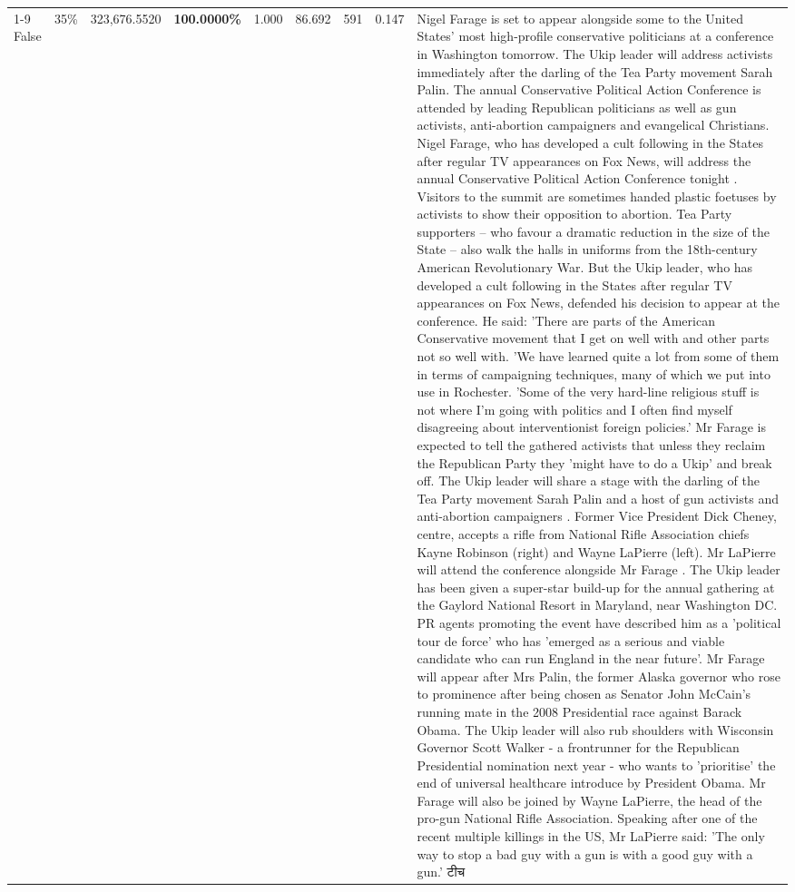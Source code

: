 \begin{table}[H]
\begin{tabular}{lllrlllll}
\cline{1-9} \cline{2-9}
False & 35\% & 323,676.5520 & \bfseries \color{red} 100.0000\% & 1.000 & 86.692 & 591 & 0.147 & Nigel Farage is set to appear alongside some to the United States' most high-profile conservative politicians at a conference in Washington tomorrow. The Ukip leader will address activists immediately after the darling of the Tea Party movement Sarah Palin. The annual Conservative Political Action Conference is attended by leading Republican politicians as well as gun activists, anti-abortion campaigners and evangelical Christians. Nigel Farage, who has developed a cult following in the States after regular TV appearances on Fox News, will address the annual Conservative Political Action Conference tonight . Visitors to the summit are sometimes handed plastic foetuses by activists to show their opposition to abortion. Tea Party supporters – who favour a dramatic reduction in the size of the State – also walk the halls in uniforms from the 18th-century American Revolutionary War. But the Ukip leader, who has developed a cult following in the States after regular TV appearances on Fox News, defended his decision to appear at the conference. He said: 'There are parts of the American Conservative movement that I get on well with and other parts not so well with. 'We have learned quite a lot from some of them in terms of campaigning techniques, many of which we put into use in Rochester. 'Some of the very hard-line religious stuff is not where I'm going with politics and I often find myself disagreeing about interventionist foreign policies.' Mr Farage is expected to tell the gathered activists that unless they reclaim the Republican Party they 'might have to do a Ukip' and break off. The Ukip leader will share a stage with the darling of the Tea Party movement Sarah Palin and a host of gun activists and anti-abortion campaigners . Former Vice President Dick Cheney, centre, accepts a rifle from National Rifle Association chiefs Kayne Robinson (right) and Wayne LaPierre (left). Mr LaPierre will attend the conference alongside Mr Farage . The Ukip leader has been given a super-star build-up for the annual gathering at the Gaylord National Resort in Maryland, near Washington DC. PR agents promoting the event have described him as a 'political tour de force' who has 'emerged as a serious and viable candidate who can run England in the near future'. Mr Farage will appear after Mrs Palin, the former Alaska governor who rose to prominence after being chosen as Senator John McCain's running mate in the 2008 Presidential race against Barack Obama. The Ukip leader will also rub shoulders with Wisconsin Governor Scott Walker - a frontrunner for the Republican Presidential nomination next year - who wants to 'prioritise' the end of universal healthcare introduce by President Obama. Mr Farage will also be joined by Wayne LaPierre, the head of the pro-gun National Rifle Association. Speaking after one of the recent multiple killings in the US, Mr LaPierre said: 'The only way to stop a bad guy with a gun is with a good guy with a gun.' टीच \\

\end{tabular}
\end{table}
